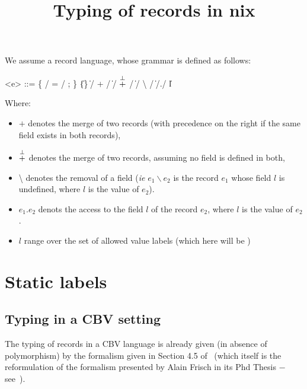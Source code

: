 

\title{Typing of records in nix}



\maketitle{}

We assume a record language, whose grammar is defined as follows:

\begin{grammar}
  <e> ::= \{ \e/ = \e/ ; \} \| \{\}
    \| \e/ + \e/
    \| \e/ $\overset{\bot}{+}{}$ \e/
    \| \e/ \textbackslash{} \e/
    \| \e/.\e/
    \| l
\end{grammar}

Where:
\begin{itemize}
  \item $+$ denotes the merge of two records (with precedence on the right if
    the same field exists in both records),
  \item $\overset{\bot}{+}{}$ denotes the merge of two records, assuming no field is
    defined in both,
  \item \textbackslash{} denotes the removal of a field (\emph{ie} $e_1
    \backslash e_2$ is the record $e_1$ whose field $l$ is undefined, where $l$
    is the value of $e_2$).
  \item $e_1 . e_2$ denots the access to the field $l$ of the record $e_2$,
    where $l$ is the value of $e_2$.
  \item $l$ range over the set of allowed value labels (which here will be )
\end{itemize}

\section{Static labels}
\subsection{Typing in a CBV setting}
The typing of records in a CBV language is already given (in absence of
polymorphism) by the formalism given in Section 4.5 of~\cite{Cas15} (which itself
is the reformulation of the formalism presented by Alain Frisch in its Phd
Thesis − see~\cite{Fri04}).

